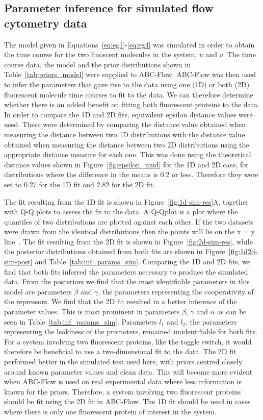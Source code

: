 \subsection{Parameter inference for simulated flow cytometry data}

The model given in Equations~\ref{eq:eg1}-\ref{eq:eg4} was simulated in order to obtain the time course for the two fluoscent molecules in the system, $u$ and $v$. The  time course data, the model and the prior distributions shown in Table~\ref{tab:priors_model} were supplied to ABC-Flow. ABC-Flow was then used to infer the parameters that gave rise to the data using one (1D) or both (2D) fluorescent molecule time courses to fit to the data. We can therefore determine whether there is an added benefit on fitting both fluorescent proteins to the data. In order to compare the 1D and 2D fits, equivalent epsilon distance values were used. These were determined by comparing the distance value obtained when measuring the distance between two 1D distributions with the distance value obtained when measuring the distance between two 2D distributions using the appropriate distance measure for each one. This was done using the theoretical distance values shown in Figure~\ref{fig:epsilon_mud} for the 1D and 2D case, for distributions where the difference in the means is 0.2 or less. Therefore they were set to 0.27 for the 1D fit and 2.82 for the 2D fit.

The fit resulting from the 1D fit is shown in Figure~\ref{fig:1d-sim-res}A, together with Q-Q plots to assess the fit to the data. A Q-Qplot is a plot where the quantiles of two distributions are plotted against each other. If the two datasets were drawn from the identical distributions then the points will lie on the x = y line~\autocite{Wilk:1968ts}. The fit resulting from the 2D fit is shown in Figure~\ref{fig:2d-sim-res}, while the posterior distributions obtained from both fits are shown in Figure~\ref{fig:1d2d-sim-post} and Table~\ref{tab:inf_params_sim}. Comparing the 1D and 2D fits, we find that both fits inferred the parameters necessary to produce the simulated data. From the posteriors we find that the most identifiable parameters in this model are parameters $β$ and $γ$, the parameters representing the cooperativity of the repressors. We find that the 2D fit resulted in a better inference of the parameter values. This is most prominent in parameters $β$, $γ$ and $α$ as can be seen in Table~\ref{tab:inf_params_sim}. Parameters $l_1$ and $l_2$, the parameters representing the leakiness of the promoters,  remained unidentifiable for both fits. For a system involving two fluorescent proteins, like the toggle switch, it would therefore be beneficial to use a two-dimensional fit to the data. The 2D fit performed better in the simulated test used here, with priors centred closely around known parameter values and clean data. This will become more evident when ABC-Flow is used on real experimental data where less information is known for the priors. Therefore, a system involving two fluorescent proteins should be fit using the 2D fit in ABC-Flow. The 1D fit should be used in cases where there is only one fluorescent protein of interest in the system. 


